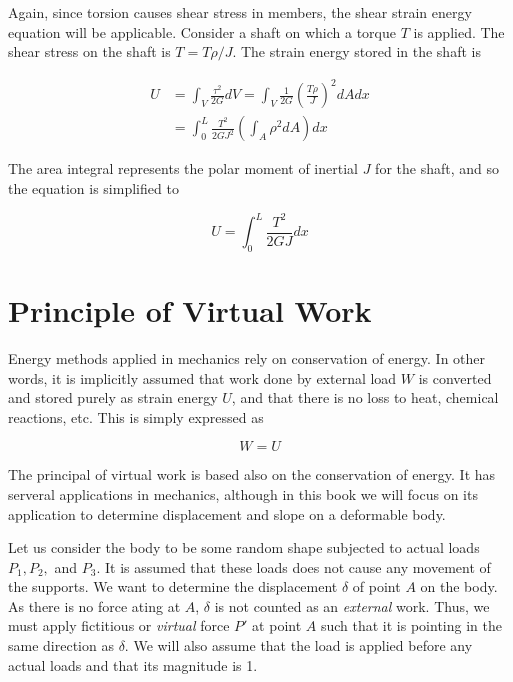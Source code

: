 \documentclass[
10pt,
a4paper,
openany,
svgnames,
]{book} %
\begin{document}
Again, since torsion causes shear stress in members, the shear strain energy equation will be applicable. Consider a shaft on which a torque $T$ is applied. The shear stress on the shaft is $T = T \rho / J$. The strain energy stored in the shaft is

\begin{align*}
  U &= \int_V \frac{\tau^2}{2G} dV = \int_V \frac{1}{2G} \left( \frac{T \rho}{J} \right)^2 dA dx \\
    &= \int_0^L \frac{T^2}{2GJ^2} \left( \int_A \rho^2 dA \right) dx
\end{align*}

The area integral represents the polar moment of inertial $J$ for the shaft, and so the equation is simplified to

\begin{equation}
  U = \int_0^L \frac{T^2}{2GJ} dx
\end{equation}

\section{Principle of Virtual Work}

Energy methods applied in mechanics rely on conservation of energy. In other words, it is implicitly assumed that work done by external load $W$ is converted and stored purely as strain energy $U$, and that there is no loss to heat, chemical reactions, etc. This is simply expressed as

\begin{equation}
  W = U
\end{equation}

The principal of virtual work is based also on the conservation of energy. It has serveral applications in mechanics, although in this book we will focus on its application to determine displacement and slope on a deformable body.

Let us consider the body to be some random shape subjected to actual loads $P_1, P_2,$ and $P_3$. It is assumed that these loads does not cause any movement of the supports. We want to determine the displacement $\delta$ of point $A$ on the body. As there is no force ating at $A$, $\delta$ is not counted as an \emph{external} work. Thus, we must apply fictitious or \emph{virtual} force $P'$ at point $A$ such that it is pointing in the same direction as $\delta$. We will also assume that the load is applied before any actual loads and that its magnitude is 1.
\end{document}
